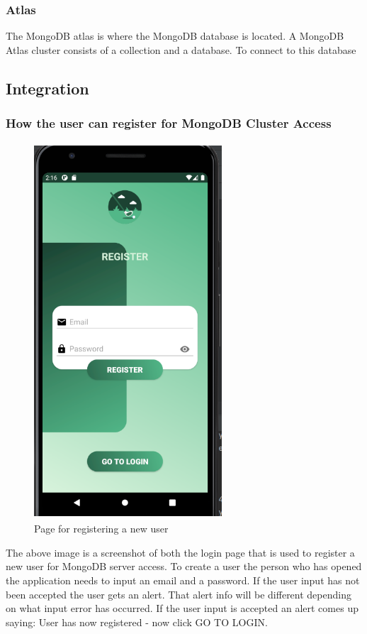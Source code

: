 \subsubsection{Atlas}
The MongoDB atlas is where the MongoDB database is located. A MongoDB Atlas cluster consists of a collection and a database. To connect to this database
\subsection{Integration}
\subsubsection{How the user can register for MongoDB Cluster Access}
\begin{figure}[H]
    \centering
    \includegraphics[width=7cm, height = 14cm]{img/registerPage.PNG}
    \caption{Page for registering a new user}
    \label{fig:altas config}
\end{figure}
The above image is a screenshot of both the login page that is used to register a new user for MongoDB server access. To create a user the person who has opened the application needs to input an email and a password. If the user input has not been accepted the user gets an alert. That alert info will be different depending on what input error has occurred. If the user input is accepted an alert comes up saying: User has now registered - now click GO TO LOGIN.
